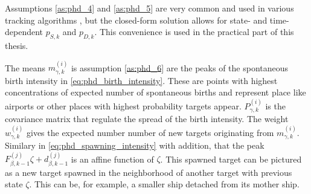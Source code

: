 Assumptions \ref{as:phd_4} and \ref{as:phd_5} are very common and used in various tracking algorithms \cite{bar1988tracking}, but the closed-form solution allows for state- and time-dependent $p_{S,k}$ and $p_{D,k}$. This convenience is used in the practical part of this thesis.

The means $m_{\gamma,k}^{(i)}$ is assumption \ref{as:phd_6} are the peaks of the spontaneous birth intensity in \eqref{eq:phd_birth_intensity}. These are points with highest concentrations of expected number of spontaneous births and represent place like airports or other places with highest probability targets appear. $P_{\gamma,k}^{(i)}$ is the covariance matrix that regulate the spread of the birth intensity. The weight $w_{\gamma, k}^{(i)}$ gives the expected number number of new targets originating from $m_{\gamma,k}^{(i)}$. Similary in \eqref{eq:phd_spawning_intensity} with addition, that the peak $F_{\beta,k-1}^{(j)}\zeta + d_{\beta,k-1}^{(j)}$ is an affine function of $\zeta$. This spawned target can be pictured as a new target spawned in the neighborhood of another target with previous state $\zeta$. This can be, for example, a smaller ship detached from its mother ship.

